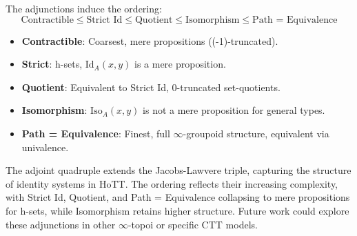 \documentclass{article}
\begin{document}
The adjunctions induce the ordering:
\[
\text{Contractible} \leq \text{Strict Id} \leq \text{Quotient} \leq \text{Isomorphism} \leq \text{Path = Equivalence}
\]
\begin{itemize}
    \item \textbf{Contractible}: Coarsest, mere propositions ((-1)-truncated).
    \item \textbf{Strict}: h-sets, $\text{Id}_A(x,y)$ is a mere proposition.
    \item \textbf{Quotient}: Equivalent to Strict Id, 0-truncated set-quotients.
    \item \textbf{Isomorphism}: $\text{Iso}_A(x,y)$ is not a mere proposition for general types.
    \item \textbf{Path = Equivalence}: Finest, full $\infty$-groupoid structure, equivalent via univalence.
\end{itemize}

The adjoint quadruple extends the Jacobs-Lawvere triple, capturing the structure of identity systems in HoTT. The ordering reflects their increasing complexity, with Strict Id, Quotient, and Path = Equivalence collapsing to mere propositions for h-sets, while Isomorphism retains higher structure. Future work could explore these adjunctions in other $\infty$-topoi or specific CTT models.
\end{document}
